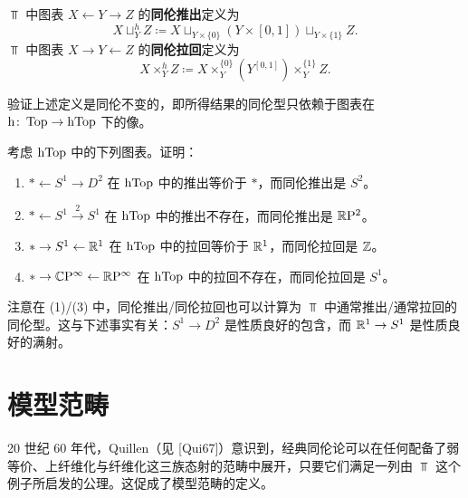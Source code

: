\begin{definition}\label{L2-1.4}
$\Top$ 中图表 $X\leftarrow Y\rightarrow Z$ 的\textbf{同伦推出}定义为
\[
X\sqcup^{h}_{Y}Z\coloneqq X\sqcup_{Y\times\{0\}}(Y\times[0,1])\sqcup_{Y\times\{1\}}Z.
\]
$\Top$ 中图表 $X\rightarrow Y\leftarrow Z$ 的\textbf{同伦拉回}定义为
\[
X\times^{h}_{Y}Z\coloneqq X\times^{\{0\}}_{Y}(Y^{[0,1]})\times^{\{1\}}_{Y}Z.
\]
\end{definition}

\begin{exercise}\label{L2-1.5}
验证上述定义是同伦不变的，即所得结果的同伦型只依赖于图表在 $\mathrm{h}\colon\operatorname{Top}\to\operatorname{hTop}$ 下的像。
\end{exercise}

\begin{exercise}\label{L2-1.6}
考虑 $\operatorname{hTop}$ 中的下列图表。证明：
\begin{enumerate}[label=(\arabic*),leftmargin=2.4em,itemsep=0.1em]
\item $\ast\leftarrow S^1\rightarrow D^2$ 在 $\operatorname{hTop}$ 中的推出等价于 $\ast$，而同伦推出是 $S^2$。
\item $\ast\leftarrow S^1\xrightarrow{\,2\,}S^1$ 在 $\operatorname{hTop}$ 中的推出不存在，而同伦推出是 $\mathbb{R}\mathrm{P}^2$。
\item $\ast\rightarrow S^1\leftarrow\mathbb{R}^1$ 在 $\operatorname{hTop}$ 中的拉回等价于 $\mathbb{R}^1$，而同伦拉回是 $\mathbb{Z}$。
\item $\ast\rightarrow\mathbb{C}\mathrm{P}^{\infty}\leftarrow\mathbb{R}\mathrm{P}^{\infty}$ 在 $\operatorname{hTop}$ 中的拉回不存在，而同伦拉回是 $S^1$。
\end{enumerate}
\end{exercise}

\begin{remark}\label{L2-1.7}
注意在 (1)/(3) 中，同伦推出/同伦拉回也可以计算为 $\Top$ 中通常推出/通常拉回的同伦型。这与下述事实有关：$S^1\to D^2$ 是性质良好的包含，而 $\mathbb{R}^1\to S^1$ 是性质良好的满射。
\end{remark}

\section{模型范畴}

\nitem\label{L2-2.1} 20 世纪 60 年代，Quillen（见 [Qui67]）意识到，经典同伦论可以在任何配备了弱等价、上纤维化与纤维化这三族态射的范畴中展开，只要它们满足一列由 $\Top$ 这个例子所启发的公理。这促成了模型范畴的定义。


